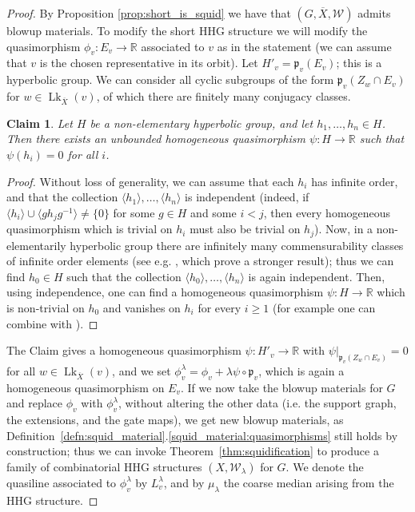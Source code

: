 \documentclass[svgnames]{amsart}
\theoremstyle{plain}
\newtheorem{claim}[thm]{Claim}
\theoremstyle{definition}
\newenvironment{claimproof}{\renewcommand{\qedsymbol}{$\blacksquare$}\begin{proof}}{\end{proof}}
\newcommand{\ov}[1]{\overline{#1}}
\newcommand{\link}{\operatorname{Lk}}
\newcommand{\W}{\mathcal{W}}
\begin{document}
\begin{proof}
    By Proposition \ref{prop:short_is_squid} we have that $(G, \ov X, \W)$ admits blowup materials. To modify the short HHG structure we will modify the quasimorphism $\phi_v\colon E_v\to \mathbb{R}$ associated to $v$ as in the statement (we can assume that $v$ is the chosen representative in its orbit). Let $H'_v=\mathfrak p_v(E_v)$; this is a hyperbolic group. We can consider all cyclic subgroups of the form $\mathfrak p_v(Z_w\cap E_v)$ for $w\in \link_{\ov X}(v)$, of which there are finitely many conjugacy classes. 

    \begin{claim}
        Let $H$ be a non-elementary hyperbolic group, and let $h_1,\dots,h_n\in H$. Then there exists an unbounded homogeneous quasimorphism $\psi\colon H\to \mathbb R$ such that $\psi(h_i)=0$ for all $i$.
    \end{claim}

    \begin{claimproof}
        Without loss of generality, we can assume that each $h_i$ has infinite order, and that the collection $\langle h_1\rangle,\dots,\langle h_n\rangle$ is independent (indeed, if $\langle h_i\rangle\cup \langle gh_jg^{-1}\rangle\neq \{0\}$ for some $g\in H$ and some $i<j$, then every homogeneous quasimorphism which is trivial on $h_i$ must also be trivial on $h_j$). Now, in a non-elementarily hyperbolic group there are infinitely many commensurability classes of infinite order elements (see e.g. \cite[Lemmas 3.4 and 3.8]{olshanskii_residualizing_hom}, which prove a stronger result); thus we can find $h_0\in H$ such that the collection $\langle h_0\rangle,\dots,\langle h_n\rangle$ is again independent. Then, using independence, one can find a homogeneous quasimorphism $\psi\colon H\to \mathbb{R}$ which is non-trivial on $h_0$ and vanishes on $h_i$ for every $i\ge 1$ (for example one can combine \cite[Theorem 4.2]{Hull_Osin} with \cite[Corollary 6.6 and Theorem 6.8]{DGO}).
    \end{claimproof}

The Claim gives a homogeneous quasimorphism $\psi:H'_v\to \mathbb R$ with $\psi|_{\mathfrak p_v(Z_w\cap E_v)}=0$ for all $w\in \link_{\ov X}(v)$, and we set $\phi^\lambda_v=\phi_v+\lambda \psi\circ \mathfrak p_v$, which is again a homogeneous quasimorphism on $E_v$. If we now take the blowup materials for $G$ and replace $\phi_v$ with $\phi^\lambda_v$, without altering the other data (i.e. the support graph, the extensions, and the gate maps), we get new blowup materials, as Definition~\ref{defn:squid_material}.\eqref{squid_material:quasimorphisms} still holds by construction; thus we can invoke Theorem~\ref{thm:squidification} to produce a family of combinatorial HHG structures $(X,\W_\lambda)$ for $G$. We denote the quasiline associated to $\phi^\lambda_v$ by $L^{\lambda}_v$, and by $\mu_\lambda$ the coarse median arising from the HHG structure.
\par\medskip


\end{proof}
\end{document}
